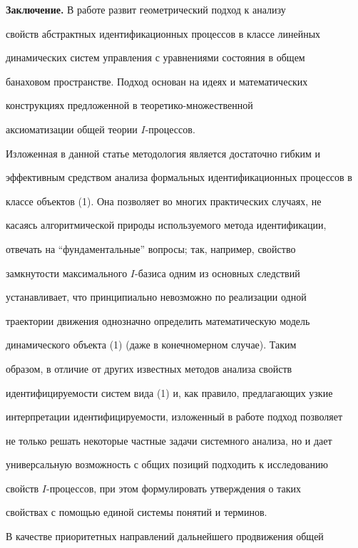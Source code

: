  


{\bf Заключение.} В работе развит геометрический подход к анализу 


свойств абстрактных идентификационных процессов в классе линейных 


динамических систем управления с уравнениями состояния в общем 


банаховом пространстве. Подход основан на идеях и математических 


конструкциях предложенной в \cite{1} теоретико-множественной 


аксиоматизации общей теории $I$-процессов. 


 


Изложенная в данной статье методология является достаточно гибким и 


эффективным средством анализа формальных идентификационных процессов в 


классе объектов (1). Она позволяет во многих практических случаях, не 


касаясь алгоритмической природы используемого метода идентификации, 


отвечать на ``фундаментальные'' вопросы; так, например, свойство 


замкнутости максимального $I$-базиса одним из основных следствий 


устанавливает, что принципиально невозможно по реализации одной 


траектории движения однозначно определить математическую модель 


динамического объекта (1) (даже в конечномерном случае). Таким 


образом, в отличие от других известных методов анализа свойств 


идентифицируемости систем вида (1) и, как правило, предлагающих узкие 


интерпретации идентифицируемости, изложенный в работе подход позволяет 


не только решать некоторые частные задачи системного анализа, но и дает 


универсальную возможность с общих позиций подходить к исследованию 


свойств $I$-процессов, при этом формулировать утверждения о таких 


свойствах с помощью единой системы понятий и терминов. 


 


В качестве приоритетных направлений дальнейшего продвижения общей 


